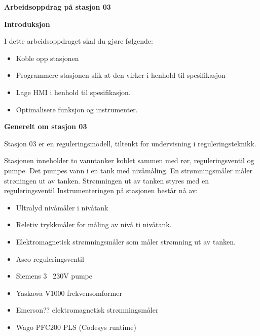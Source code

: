 \newpage


\begin{center}
\textbf{Arbeidsoppdrag på stasjon 03}
\vskip 5pt 
\vskip 5pt 
\end{center}

\vskip 10pt 
\textbf{Introduksjon}

\vskip 5pt 
I dette arbeidsoppdraget skal du gjøre følgende:
\begin{itemize}[noitemsep]
	\item Koble opp stasjonen 
	\item Programmere stasjonen slik at den virker i henhold til spesifikasjon
	\item Lage HMI i henhold til spesifikasjon. 
	\item Optimalisere funksjon og instrumenter. 
\end{itemize}

\textbf{Generelt om stasjon 03}

\vskip 5pt 
Stasjon 03 er en reguleringsmodell, tiltenkt for undervisning i reguleringsteknikk.  

\vskip 5pt 
Stasjonen inneholder to vanntanker koblet sammen med rør, reguleringsventil og pumpe. Det pumpes vann i en tank med nivåmåling. En strømningsmåler måler strøningen ut av tanken. Strømningen ut av tanken styres med en reguleringsventil
\vskip 5pt 
Instrumenteringen på stasjonen består nå av:  
\begin{itemize}[noitemsep]
	\item Ultralyd nivåmåler i nivåtank
	\item Reletiv trykkmåler for måling av nivå ti nivåtank.
	\item Elektromagnetisk strømningsmåler som måler strømning ut av tanken.
	\item Asco reguleringsventil
	\item Siemens 3~ 230V pumpe
	\item Yaskawa V1000 frekvensomformer
	\item Emerson?? elektromagnetisk strømningsmåler
	\item Wago PFC200 PLS (Codesys runtime)
\end{itemize}


